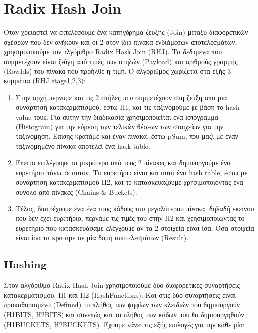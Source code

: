 \documentclass[12pt, a4paper]{article}
\begin{document}
\section{Radix Hash Join}

Όταν χρειαστεί να εκτελέσουμε ένα κατηγόρημα ζεύξης (Join) μεταξύ διαφορετικών σχέσεων που δεν ανήκουν και οι 2 στον ίδιο πίνακα ενδιάμεσων αποτελεσμάτων, χρησιμοποιούμε τον αλγόριθμο Radix Hash Join (RHJ). Τα δεδομένα που συμμετέχουν είναι ζεύγη από τιμές των στηλών (Payload) και αριθμούς γραμμής (RowIds) του πίνακα που προήλθε η τιμή. Ο αλγόριθμος χωρίζεται στα εξής 3 κομμάτια (RHJ stage1,2,3):

\begin{enumerate}
\item Στην αρχή περνάμε και τις 2 στήλες που συμμετέχουν στη ζεύξη απο μια συνάρτηση κατακερματισμού, έστω H1, και τις ταξινομούμε με βάση το hash value τους. Για αυτήν την διαδικασία χρησιμοποιείται ένα ιστόγραμμα (Histogram) για την εύρεση των τελικών θέσεων των στοιχείων για την ταξινόμηση. Επίσης κρατάμε και έναν πίνακα, έστω pSum, που μαζί με έναν ταξινομημένο πίνακα αποτελεί ένα hash table.
\item Έπειτα επιλέγουμε το μικρότερο από τους 2 πίνακες και δημιουργούμε ένα ευρετήριο πάνω σε αυτόν. Το ευρετήριο είναι και αυτό ένα hash table, έστω με συνάρτηση κατακερματισμού H2, και το κατασκευάζουμε χρησιμοποιόντας ένα σύνολο από πίνακες (Chains \& Buckets).
\item Τέλος, διατρέχουμε ένα ένα τους κάδους του μεγαλύτερου πίνακα, δηλαδή εκείνου που δεν έχει ευρετήριο, περνάμε τις τιμές του στην H2 και χρησιμοποιώντας το ευρετήριο που κατασκευάσαμε ελέγχουμε αν τα 2 στοιχεία είναι ίσα. Όσα στοιχεία είναι ίσα τα κρατάμε σε μία δομή αποτελεσμάτων (Result).
\end{enumerate}


\subsection{Hashing}

Στον αλγόριθμο Radix Hash Join χρησιμοποιούμε δύο διαφορετικές συναρτήσεις κατακερματισμού, H1 και H2 (HashFunctions). Και στις δύο συναρτήσεις είναι προκαθορισμένο (Defined) το πλήθος των ψηφίων των κλειδιών που δημιουργούν (H1BITS, H2BITS) και συνεπώς και το πλήθος των κάδων που θα δημιουργηθούν (H1BUCKETS, H2BUCKETS). Έχουμε κάνει τις εξής επιλογές για την κάθε μία:
\end{document}
